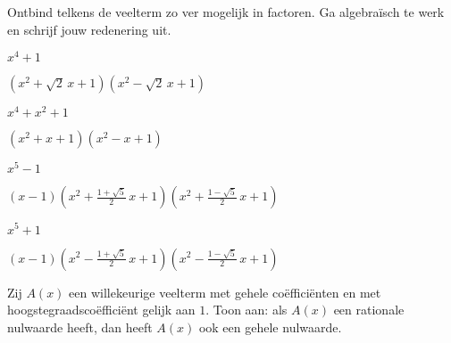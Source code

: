 \documentclass{ximera}
\begin{document}
\begin{exercise}
Ontbind telkens de veelterm zo ver mogelijk in factoren. Ga algebraïsch te werk en schrijf jouw redenering uit.  

	\begin{question} \(x^4+1\)         \begin{uitkomst} \((x^2+\sqrt{2}\,x+1)(x^2-\sqrt{2}\,x+1)                                                    \) \end{uitkomst} \end{question}
	\begin{question} \(x^4 + x^2 + 1\) \begin{uitkomst} \((x^2+x+1)(x^2-x+1)                                                                        \) \end{uitkomst} \end{question}
	\begin{question} \(x^5-1\)         \begin{uitkomst} \((x-1)\left(x^2+\frac{1+\sqrt{5}}{2}\,x+1\right)\left(x^2+\frac{1-\sqrt{5}}{2}\,x+1\right) \) \end{uitkomst} \end{question}
	\begin{question} \(x^5+1\)         \begin{uitkomst} \((x-1)\left(x^2-\frac{1+\sqrt{5}}{2}\,x+1\right)\left(x^2-\frac{1-\sqrt{5}}{2}\,x+1\right) \) \end{uitkomst} \end{question}
\end{exercise}

	

\begin{exercise}
Zij \(A(x)\) een willekeurige veelterm met gehele coëfficiënten en met hoogstegraadscoëfficiënt gelijk aan \(1\). Toon aan: als \(A(x)\) een rationale nulwaarde heeft, dan heeft \(A(x)\) ook een gehele nulwaarde.
\end{exercise}
\end{document}
